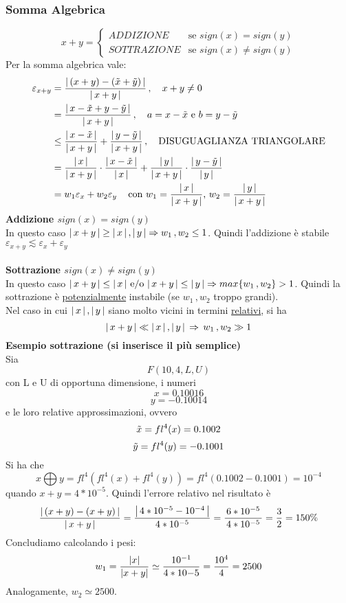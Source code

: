 \subsubsection{Somma Algebrica}
\[x+y = 
\begin{cases}
ADDIZIONE & \text{se $sign(x)=sign(y)$} \\
SOTTRAZIONE & \text{se $sign(x) \ne sign(y)$}
\end{cases}
\]
Per la somma algebrica vale:
\[\begin{split}
\varepsilon_{x+y} & = \frac{\abs*{\,(x + y) - (\Tilde{x} + \Tilde{y})\,}}{\abs*{\,x + y\,}} \,, \quad x + y \ne 0 \\
& = \frac{\abs*{\,x - \Tilde{x} + y - \Tilde{y}\,}}{\abs*{\,x + y\,}} \,, \quad a = x - \Tilde{x} \text{ e } b = y - \Tilde{y} \\
& \le \frac{\abs*{\,x - \Tilde{x}\,}}{\abs*{\,x + y\,}} + \frac{\abs*{\,y - \Tilde{y}\,}}{\abs*{\,x + y\,}} \,, \quad \text{DISUGUAGLIANZA TRIANGOLARE} \\
& = \frac{\abs*{\,x\,}}{\abs*{\,x + y\,}} \cdot \frac{\abs*{\,x - \Tilde{x}\,}}{\abs*{\,x\,}} + \frac{\abs*{\,y\,}}{\abs*{\,x + y\,}} \cdot \frac{\abs*{\,y - \Tilde{y}\,}}{\abs*{\,y\,}} \\
& = w_1 \varepsilon_x + w_2 \varepsilon_y \, \quad \text{con $w_1=\frac{\abs*{\,x\,}}{\abs*{\,x + y\,}}$, $w_2=\frac{\abs*{\,y\,}}{\abs*{\,x + y\,}}$}
\end{split}\]
\textbf{Addizione $sign(x)=sign(y)$}\\
In questo caso $\abs*{\,x + y\,} \ge \abs*{\,x\,}\,,\abs*{\,y\,} \Rightarrow w_1\,,w_2 \le 1$. Quindi l'addizione è stabile $\varepsilon_{x+y}\lesssim \varepsilon_x+\varepsilon_y$
\\\\\textbf{Sottrazione $sign(x)\ne sign(y)$}\\
In questo caso $\abs*{\,x + y\,} \le \abs*{\,x\,} \text{ e/o } \abs*{\,x + y\,} \le \abs*{\,y\,} \Rightarrow max\{w_1\,,w_2\} > 1$. Quindi la sottrazione è \underline{potenzialmente} instabile (se $w_1\,,w_2$ troppo grandi).\\
Nel caso in cui $\abs*{\,x\,}\,,\abs*{\,y\,}$ siano molto vicini in termini \underline{relativi}, si ha
\[
\abs*{\,x + y\,} \ll \abs*{\,x\,}\,,\abs*{\,y\,} \, \Rightarrow \, w_1\,,w_2 \gg 1
\]
\textbf{Esempio sottrazione (si inserisce il più semplice)}\\
Sia \[F(10,4,L,U)\] con L e U di opportuna dimensione, i numeri 
\[x=0.10016\]
\[y=-0.10014\]
e le loro relative approssimazioni, ovvero
\[\Tilde{x}=fl^4(x)=0.1002\]
\[\Tilde{y}=fl^4(y)=-0.1001\]
Si ha che
\[x \bigoplus y=fl^4(fl^4(x)+fl^4(y))=fl^4(0.1002-0.1001)=10^{-4}\]
quando $x+y=4*10^{-5}$. Quindi l'errore relativo nel risultato è
\[\frac{\abs*{\,(x + y) - (x + y)\,}}{\abs*{\,x + y\,}} = \frac{\abs*{\,4*10^{-5} - 10^{-4}\,}}{\,4*10^{-5}\,} = \frac{\,6*10^{-5}\,}{\,4*10^{-5}\,} = \frac{3}{2} = 150\%\]
Concludiamo calcolando i pesi:
\[ w_1=\frac{\abs*{x}}{\abs{x+y}} \simeq \frac{10^{-1}}{4*10{-5}}=\frac{10^4}{4}=2500 \]
Analogamente, $w_2 \simeq 2500.$